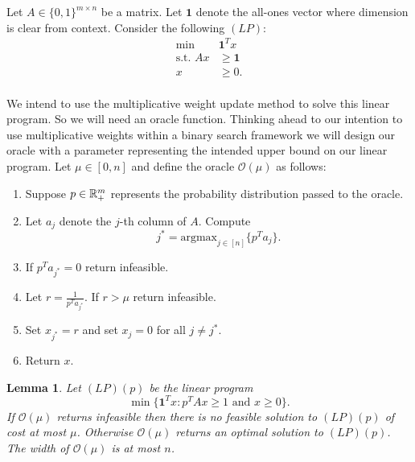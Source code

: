 \documentclass[letterpaper,12pt,oneside,onecolumn]{article}
\newcommand{\cO}{\mathcal{O}} \newcommand{\cP}{\mathcal{P}}
\newtheorem{lemma}[fact]{Lemma}
\begin{document}
\section{}
\paragraph{}
Let $A \in \{0,1\}^{m\times n}$ be a matrix. Let $\mathbf{1}$ denote the all-ones vector where dimension is clear from context. Consider the following $(LP)$:
\begin{align*}
\min\ &\mathbf{1}^T x \\
\text{s.t. } Ax &\geq \mathbf{1} \\
x &\geq 0.
\end{align*}
\paragraph{}
We intend to use the multiplicative weight update method to solve this linear program. So we will need an oracle function. Thinking ahead to our intention to use multiplicative weights within a binary search framework we will design our oracle with a parameter representing the intended upper bound on our linear program. Let $\mu \in [0,n]$ and define the oracle $\cO(\mu)$ as follows:
\begin{enumerate}
\item Suppose $p\in \mathbb{R}^m_+$ represents the probability distribution passed to the oracle.
\item Let $a_j$ denote the $j$-th column of $A$. Compute
$$j^* = \text{argmax}_{j \in [n]} \{p^Ta_j\}.$$
\item If $p^Ta_{j^*} = 0$ return infeasible.
\item Let $r = \frac{1}{p^Ta_{j^*}}$. If $r  > \mu$ return infeasible.
\item Set $x_{j^*} = r$ and set $x_j = 0$ for all $j \neq j^*$.
\item Return $x$.
\end{enumerate}
\begin{lemma}\label{lemma:oracle}
Let $(LP)(p)$ be the linear program
$$\min\{\mathbf{1}^Tx : p^TAx \geq 1 \text{ and } x \geq 0\}.$$
If $\cO(\mu)$ returns infeasible then there is no feasible solution to $(LP)(p)$ of cost at most $\mu$. Otherwise $\cO(\mu)$ returns an optimal solution to $(LP)(p)$. The width of $\cO(\mu)$ is at most $n$.
\end{lemma}
\end{document}

